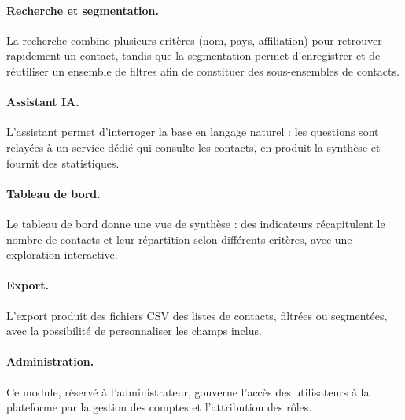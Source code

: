 \paragraph{Recherche et segmentation.}
La recherche combine plusieurs critères (nom, pays, affiliation) pour retrouver rapidement un contact, tandis que la segmentation permet d'enregistrer et de réutiliser un ensemble de filtres afin de constituer des sous-ensembles de contacts.

\paragraph{Assistant IA.}
L'assistant permet d'interroger la base en langage naturel : les questions sont relayées à un service dédié qui consulte les contacts, en produit la synthèse et fournit des statistiques.

\paragraph{Tableau de bord.}
Le tableau de bord donne une vue de synthèse : des indicateurs récapitulent le nombre de contacts et leur répartition selon différents critères, avec une exploration interactive.

\paragraph{Export.}
L'export produit des fichiers CSV des listes de contacts, filtrées ou segmentées, avec la possibilité de personnaliser les champs inclus.

\paragraph{Administration.}
Ce module, réservé à l'administrateur, gouverne l'accès des utilisateurs à la plateforme par la gestion des comptes et l'attribution des rôles.

